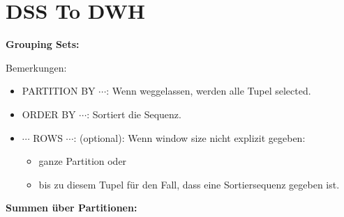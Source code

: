 
\section{DSS To DWH}

\begin{breakbox}
\textbf{Grouping Sets:}

Bemerkungen:
\begin{itemize}
	\item PARTITION BY $\cdots$: Wenn weggelassen, werden alle Tupel selected.
	\item ORDER BY $\cdots$: Sortiert die Sequenz.
	\item $\cdots$ ROWS $\cdots$: (optional): Wenn window size nicht explizit gegeben:
		\begin{itemize}
			\item ganze Partition oder
			\item bis zu diesem Tupel für den Fall, dass eine Sortiersequenz gegeben ist.
		\end{itemize}
\end{itemize}
\end{breakbox}

\begin{breakbox}
\textbf{Summen über Partitionen:}

\end{breakbox}
